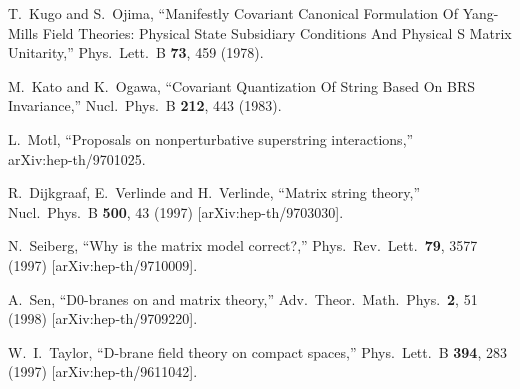 \documentclass[12pt,a4paper]{article}
\begin{document}
\begin{thebibliography}{99}
 T.~Kugo and S.~Ojima,
	``Manifestly Covariant Canonical Formulation Of Yang-Mills
	Field Theories: Physical State Subsidiary Conditions And
	Physical S Matrix Unitarity,''
	Phys.\ Lett.\ B {\bf 73}, 459 (1978).

 M.~Kato and K.~Ogawa,
	``Covariant Quantization Of String Based On BRS Invariance,''
	Nucl.\ Phys.\ B {\bf 212}, 443 (1983).

L.~Motl,
	``Proposals on nonperturbative superstring interactions,''\\
	arXiv:hep-th/9701025.

R.~Dijkgraaf, E.~Verlinde and H.~Verlinde,
	``Matrix string theory,''
	Nucl.\ Phys.\ B {\bf 500}, 43 (1997)
	[arXiv:hep-th/9703030].

 N.~Seiberg,
	``Why is the matrix model correct?,''
	Phys.\ Rev.\ Lett.\  {\bf 79}, 3577 (1997)
	[arXiv:hep-th/9710009].

 A.~Sen,
	``D0-branes on \coordHE{} and matrix theory,''
	Adv.\ Theor.\ Math.\ Phys.\  {\bf 2}, 51 (1998)
	[arXiv:hep-th/9709220].

 W.~I.~Taylor,
	``D-brane field theory on compact spaces,''
	Phys.\ Lett.\ B {\bf 394}, 283 (1997)
	[arXiv:hep-th/9611042].

\end{thebibliography}
\end{document}
